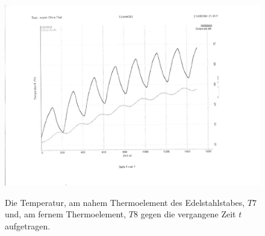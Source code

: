 \begin{table}
	\centering
	\caption{Die aus dem Graphen in Abbildung \ref{fig:Graph6} entnommenen Werte für die Phasendifferenz $\Delta t$ die Amplitude am nahem Thermoelement des Aluminiumstabes $A_\text{nah}$ und am fernem Thermoelement $A_\text{fern}$.}
	
\end{table}
\begin{figure}
	\centering
	\caption{Die Temperatur, am nahem Thermoelement des Edelstahlstabes, $T7$ und, am fernem Thermoelement, $T8$ gegen die vergangene Zeit $t$ aufgetragen.}
	\includegraphics[width=\linewidth-70pt,height=\textheight-70pt,keepaspectratio]{content/Bilder/T7T8-rotated.pdf}
	\label{fig:Graph7}
\end{figure}
\begin{table}
	\centering
	\caption{Die aus dem Graphen in Abbildung \ref{fig:Graph7} entnommenen Werte für die Phasendifferenz $\Delta t$ die Amplitude am nahem Thermoelement des Edelstahlstabes $A_\text{nah}$ und am fernem Thermoelement $A_\text{fern}$.}
	
\end{table}